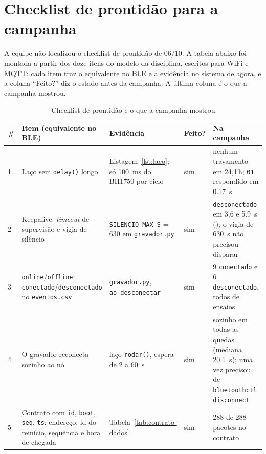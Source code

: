 \chapter{Checklist de prontidão para a campanha}
\label{ap:checklist}

A equipe não localizou o checklist de prontidão de 06/10. A tabela abaixo
foi montada a partir dos doze itens do modelo da disciplina, escritos para
WiFi e MQTT: cada item traz o equivalente no BLE e a evidência no sistema
de agora, e a coluna \enquote{Feito?} diz o estado antes da campanha. A
última coluna é o que a campanha mostrou.

\begin{table}[H]
\centering
\caption{Checklist de prontidão e o que a campanha mostrou}
\label{tab:checklist}
\scriptsize
\setlength{\tabcolsep}{3pt}
\begin{tabular}{@{}C{0.4cm}L{4.0cm}L{4.8cm}C{1.0cm}L{4.0cm}@{}}
\toprule
\textbf{\#} & \textbf{Item (equivalente no BLE)} & \textbf{Evidência} & \textbf{Feito?} & \textbf{Na campanha} \\
  & Laço sem \texttt{delay()} longo
   & Listagem~\ref{lst:laco}; só \SI{100}{\milli\second} do BH1750 por ciclo & sim & nenhum travamento em 24,1\,h; \texttt{01} respondido em \SI{0.17}{\second} \\
2  & Keepalive: \emph{timeout} de supervisão e vigia de silêncio
   & \texttt{SILENCIO\_MAX\_S} = 630 em \texttt{gravador.py} & sim & \texttt{desconectado} em 3,6 e \SI{5.9}{\second} (); o vigia de \SI{630}{\second} não precisou disparar \\
3  & \texttt{online}/\texttt{offline}: \texttt{conectado}/\texttt{desconectado} no \texttt{eventos.csv}
   & \texttt{gravador.py}, \texttt{ao\_desconectar} & sim & 9 \texttt{conectado} e 6 \texttt{desconectado}, todos de ensaios \\
4  & O gravador reconecta sozinho ao nó
   & laço \texttt{rodar()}, espera de 2 a \SI{60}{\second} & sim & sozinho em todas as quedas (mediana \SI{20.1}{\second}); uma vez precisou de \texttt{bluetoothctl disconnect} \\
5  & Contrato com \texttt{id}, \texttt{boot}, \texttt{seq}, \texttt{ts}: endereço, id do reinício, sequência e hora de chegada
   & Tabela~\ref{tab:contrato-dados} & sim & 288 de 288 pacotes no contrato \\

\end{tabular}
\end{table}
